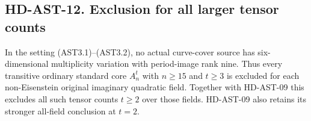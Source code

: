 \subsection*{HD-AST-12. Exclusion for all larger tensor counts}

\begin{theorem}[HD-AST-12]
In the setting (AST3.1)--(AST3.2), no actual curve-cover source has
six-dimensional multiplicity variation with period-image rank nine.
Thus every transitive ordinary standard core $A_n^t$ with
$n\ge15$ and $t\ge3$ is excluded for each non-Eisenstein original
imaginary quadratic field.  Together with HD-AST-09 this excludes
all such tensor counts $t\ge2$ over those fields.  HD-AST-09
also retains its stronger all-field conclusion at $t=2$.
\end{theorem}

